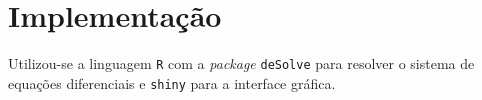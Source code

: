 \section{Implementação}
Utilizou-se a linguagem \texttt{R} com a \emph{package} \texttt{deSolve} para resolver o sistema de equações diferenciais e \texttt{shiny} para a interface gráfica.
